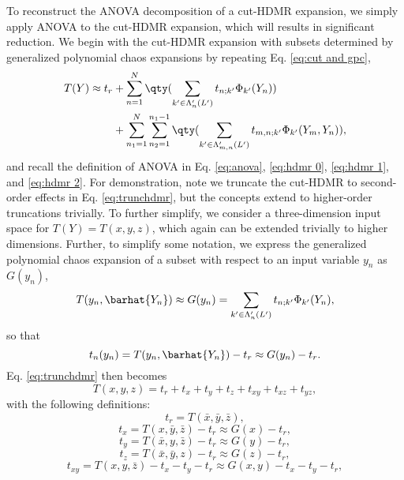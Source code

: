 To reconstruct the ANOVA decomposition of a cut-HDMR expansion, we simply apply ANOVA to the cut-HDMR
expansion, which will results in significant reduction.  We begin with the cut-HDMR expansion with
subsets determined by generalized polynomial chaos expansions by repeating Eq. \ref{eq:cut and gpc},
\begin{align}\label{eq:trunchdmr}
  T(Y) \approx t_r &+ \sum_{n=1}^N \qty(\sum_{k'\in\Lambda_n'(L')} t_{n;k'}\Phi_{k'}(Y_n)) \\ \nonumber
  &+ \sum_{n_1=1}^N \sum_{n_2=1}^{n_1-1} \qty(\sum_{k'\in\Lambda_{m,n}'(L')} t_{m,n;k'}\Phi_{k'}(Y_m,Y_n)),
\end{align}
and recall the definition of ANOVA in Eq. \ref{eq:anova}, \ref{eq:hdmr 0}, \ref{eq:hdmr 1}, and \ref{eq:hdmr 2}.
For demonstration, note we truncate the cut-HDMR to second-order effects in Eq. \ref{eq:trunchdmr}, but the 
concepts extend to higher-order truncations trivially.  To further simplify, we consider a three-dimension
input space for $T(Y) = T(x,y,z)$, which again can be extended trivially to higher dimensions.  Further,
to simplify some notation, we express the generalized polynomial chaos expansion of a subset with respect
to an input variable $y_n$ as $G(y_n)$,
\begin{equation}
  T(y_n,\barhat{Y_n}) \approx G(y_n) = \sum_{k'\in\Lambda_n'(L')} t_{n;k'}\Phi_{k'}(Y_n),
\end{equation}
so that
\begin{equation}
  t_n(y_n) = T(y_n,\barhat{Y_n}) - t_r \approx G(y_n) - t_r.
\end{equation}
Eq. \ref{eq:trunchdmr} then becomes
\begin{equation}
  T(x,y,z) = t_r + t_x + t_y + t_z + t_{xy} + t_{xz} + t_{yz},
\end{equation}
with the following definitions:
\begin{equation}
  t_r = T(\bar x, \bar y, \bar z),
\end{equation}
\begin{equation}
  t_x = T(x, \bar y, \bar z) - t_r \approx G(x) - t_r,
\end{equation}
\begin{equation}
  t_y = T(\bar x, y, \bar z) - t_r \approx G(y) - t_r,
\end{equation}
\begin{equation}
  t_z = T(\bar x, \bar y, z) - t_r \approx G(z) - t_r,
\end{equation}
\begin{equation}
  t_{xy} = T(x, y, \bar z) - t_x - t_y - t_r \approx G(x,y) - t_x - t_y - t_r,
\end{equation}
